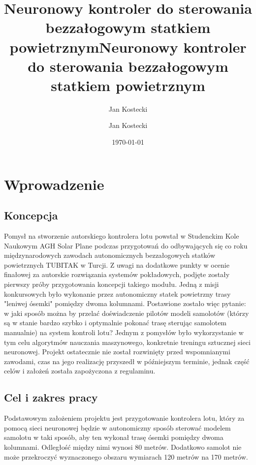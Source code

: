 \documentclass[12pt, a4paper]{article}
\title{Neuronowy kontroler do sterowania bezzałogowym statkiem powietrznym}
\author{Jan Kostecki}
\title{Neuronowy kontroler do sterowania bezzałogowym statkiem powietrznym}
\author{Jan Kostecki}
\date{\today}
\begin{document}
\onehalfspacing
\maketitle
\newpage
\tableofcontents

\clearpage

\section{Wprowadzenie}
\subsection{Koncepcja}

Pomysł na stworzenie autorskiego kontrolera lotu powstał w Studenckim Kole Naukowym AGH Solar Plane podczas przygotowań do odbywających się co roku międzynarodowych zawodach autonomicznych bezzałogowych statków powietrznych TUBITAK w Turcji. Z uwagi na dodatkowe punkty w ocenie finałowej za autorskie rozwiązania systemów pokładowych, podjęte zostały pierwszy próby przygotowania koncepcji takiego modułu. Jedną z misji konkursowych było wykonanie przez autonomiczny statek powietrzny trasy "leniwej ósemki" pomiędzy dwoma kolumnami. Postawione zostało więc pytanie: w jaki sposób można by przelać doświadczenie pilotów modeli samolotów (którzy są w stanie bardzo szybko i optymalnie pokonać trasę sterując samolotem manualnie) na system kontroli lotu? Jednym z pomysłów było wykorzystanie w tym celu algorytmów nauczania maszynowego, konkretnie treningu sztucznej sieci neuronowej. Projekt ostatecznie nie został rozwinięty przed wspomnianymi zawodami, czas na jego realizację przyszedł w późniejszym terminie, jednak część celów i założeń została zapożyczona z regulaminu.

\subsection{Cel i zakres pracy}
Podstawowym założeniem projektu jest przygotowanie kontrolera lotu, który za pomocą sieci neuronowej będzie w autonomiczny sposób sterować modelem samolotu w taki sposób, aby ten wykonał trasę ósemki pomiędzy dwoma kolumnami. Odległość między nimi wynosi 80 metrów. Dodatkowo samolot nie może przekroczyć wyznaczonego obszaru  wymiarach 120 metrów na 170 metrów.
\end{document}
